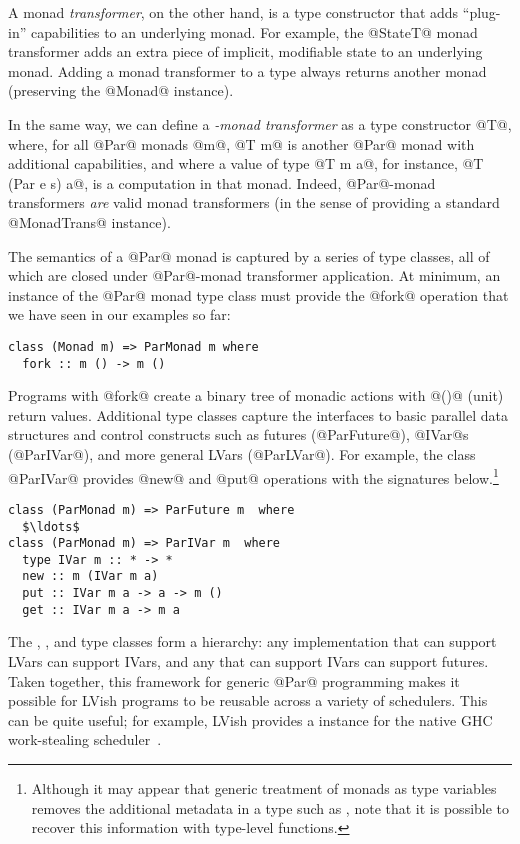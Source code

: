 A monad \emph{transformer}, on the other hand, is a type constructor
that adds ``plug-in'' capabilities to an underlying monad.  For
example, the @StateT@ monad transformer adds an extra piece of
implicit, modifiable state to an underlying monad.  Adding a monad
transformer to a type always returns another monad (preserving the
@Monad@ instance).

In the same way, we can define a \emph{-monad transformer} as
a type constructor @T@, where, for all @Par@ monads @m@, @T m@ is
another @Par@ monad with additional capabilities, and where a value of
type @T m a@, for instance, @T (Par e s) a@, is a computation in that
monad.  Indeed, @Par@-monad transformers \emph{are} valid monad
transformers (in the sense of providing a standard @MonadTrans@
instance).

The semantics of a @Par@ monad is captured by a series of type
classes, all of which are closed under @Par@-monad transformer
application.  At minimum, an instance of the @Par@ monad type class
must provide the @fork@ operation that we have seen in our examples so
far:

\singlespacing
\begin{lstlisting}
class (Monad m) => ParMonad m where
  fork :: m () -> m ()
\end{lstlisting}
\doublespacing

Programs with @fork@ create a binary tree of monadic actions with @()@
(unit) return values.  Additional type classes capture the interfaces
to basic parallel data structures and control constructs such as
futures (@ParFuture@), @IVar@s (@ParIVar@), and more general LVars
(@ParLVar@). For example, the class @ParIVar@ provides @new@ and @put@
operations with the signatures below.\footnote{Although it may appear
  that generic treatment of  monads as type variables 
  removes the additional metadata in a type such as ,
  note that it is possible to recover this information with type-level
  functions.}

\singlespacing
\begin{lstlisting}[mathescape=true]
class (ParMonad m) => ParFuture m  where
  $\ldots$ 
class (ParMonad m) => ParIVar m  where
  type IVar m :: * -> *
  new :: m (IVar m a)
  put :: IVar m a -> a -> m ()
  get :: IVar m a -> m a
\end{lstlisting}
\doublespacing

The , , and  type classes form a
hierarchy: any implementation that can support LVars can support
IVars, and any that can support IVars can support futures.  Taken
together, this framework for generic @Par@ programming makes it
possible for LVish programs to be reusable across a variety of
schedulers.  This can be quite useful; for example, LVish provides a
 instance for the native GHC work-stealing
scheduler~\cite{runtime-support-multicore-haskell}.

